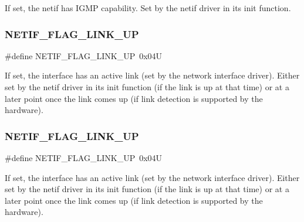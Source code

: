 If set, the netif has I\+G\+MP capability. Set by the netif driver in its init function. \mbox{\label{group__netif__flags_ga75f5a2b9276c93e3bd18a568459fd2d8}} 
\subsubsection{\texorpdfstring{N\+E\+T\+I\+F\+\_\+\+F\+L\+A\+G\+\_\+\+L\+I\+N\+K\+\_\+\+UP}{NETIF\_FLAG\_LINK\_UP}\hspace{0.1cm}{\footnotesize\ttfamily [1/2]}}
{\footnotesize\ttfamily \#define N\+E\+T\+I\+F\+\_\+\+F\+L\+A\+G\+\_\+\+L\+I\+N\+K\+\_\+\+UP~0x04U}

If set, the interface has an active link (set by the network interface driver). Either set by the netif driver in its init function (if the link is up at that time) or at a later point once the link comes up (if link detection is supported by the hardware). \mbox{\label{group__netif__flags_ga75f5a2b9276c93e3bd18a568459fd2d8}} 
\subsubsection{\texorpdfstring{N\+E\+T\+I\+F\+\_\+\+F\+L\+A\+G\+\_\+\+L\+I\+N\+K\+\_\+\+UP}{NETIF\_FLAG\_LINK\_UP}\hspace{0.1cm}{\footnotesize\ttfamily [2/2]}}
{\footnotesize\ttfamily \#define N\+E\+T\+I\+F\+\_\+\+F\+L\+A\+G\+\_\+\+L\+I\+N\+K\+\_\+\+UP~0x04U}

If set, the interface has an active link (set by the network interface driver). Either set by the netif driver in its init function (if the link is up at that time) or at a later point once the link comes up (if link detection is supported by the hardware). \mbox{\label{group__netif__flags_gab14fbe1447d2fdbdf5abc87f51eb6508}} 
